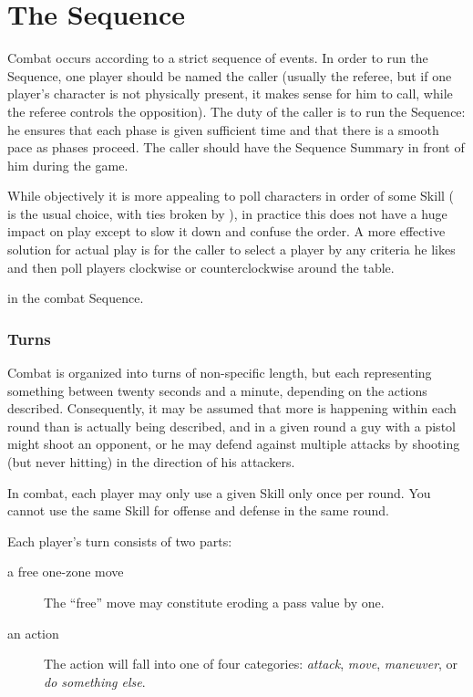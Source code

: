 \section{The Sequence}\label{sec:personal-combat-sequence}

Combat occurs according to a strict sequence of events. In order to run the Sequence, one player should be named the caller (usually the referee, but if one player's character is not physically present, it makes sense for him to call, while the referee controls the opposition). The duty of the caller is to run the Sequence: he ensures that each phase is given sufficient time and that there is a smooth pace as phases proceed. The caller should have the Sequence Summary in front of him during the game.

While objectively it is more appealing to poll characters in order of some Skill ( is the usual choice, with ties broken by ), in practice this does not have a huge impact on play except to slow it down and confuse the order. A more effective solution for actual play is for the caller to select a player by any criteria he likes and then poll players clockwise or counterclockwise around the table.

 in the combat Sequence.

\subsubsection{Turns}

Combat is organized into turns of non-specific length, but each representing something between twenty seconds and a minute, depending on the actions described. Consequently, it may be assumed that more is happening within each round than is actually being described, and in a given round a guy with a pistol might shoot an opponent, or he may defend against multiple attacks by shooting (but never hitting) in the direction of his attackers.

In combat, each player may only use a given Skill only once per round. You cannot use the same Skill for offense and defense in the same round.

Each player's turn consists of two parts:
\begin{description}
\item [a free one-zone move]
%
The ``free'' move may constitute eroding a pass value by one.

\item [an action] The action will fall into one of four categories: \emph{attack}, \emph{move}, \emph{maneuver}, or \emph{do something else}.
\end{description}

